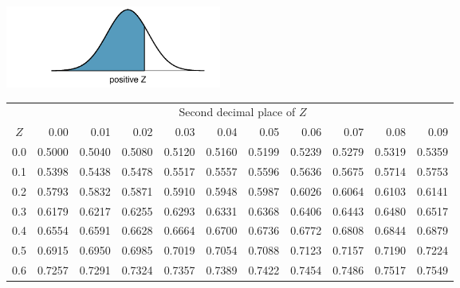 \begin{table}[p]
\begin{center}{\small
\includegraphics[width=71mm]{extraTeX/appendix/figures/normalTails/normalTailRight} \vspace{2mm} \\
\begin{tabular}{c | rrrrr | rrrrr |}
  \cline{2-11}
&&&& \multicolumn{4}{c}{Second decimal place of $Z$} &&& \\
  \cline{2-11}
$Z$ & 0.00 & 0.01 & 0.02 & 0.03 & 0.04 & 0.05 & 0.06 & 0.07 & 0.08 & 0.09 \\
  \hline
  \hline
0.0 & \scriptsize{0.5000} & \scriptsize{0.5040} & \scriptsize{0.5080} & \scriptsize{0.5120} & \scriptsize{0.5160} & \scriptsize{0.5199} & \scriptsize{0.5239} & \scriptsize{0.5279} & \scriptsize{0.5319} & \scriptsize{0.5359} \\
  0.1 & \scriptsize{0.5398} & \scriptsize{0.5438} & \scriptsize{0.5478} & \scriptsize{0.5517} & \scriptsize{0.5557} & \scriptsize{0.5596} & \scriptsize{0.5636} & \scriptsize{0.5675} & \scriptsize{0.5714} & \scriptsize{0.5753} \\
  0.2 & \scriptsize{0.5793} & \scriptsize{0.5832} & \scriptsize{0.5871} & \scriptsize{0.5910} & \scriptsize{0.5948} & \scriptsize{0.5987} & \scriptsize{0.6026} & \scriptsize{0.6064} & \scriptsize{0.6103} & \scriptsize{0.6141} \\
  0.3 & \scriptsize{0.6179} & \scriptsize{0.6217} & \scriptsize{0.6255} & \scriptsize{0.6293} & \scriptsize{0.6331} & \scriptsize{0.6368} & \scriptsize{0.6406} & \scriptsize{0.6443} & \scriptsize{0.6480} & \scriptsize{0.6517} \\
  0.4 & \scriptsize{0.6554} & \scriptsize{0.6591} & \scriptsize{0.6628} & \scriptsize{0.6664} & \scriptsize{0.6700} & \scriptsize{0.6736} & \scriptsize{0.6772} & \scriptsize{0.6808} & \scriptsize{0.6844} & \scriptsize{0.6879} \\
  \hline
  0.5 & \scriptsize{0.6915} & \scriptsize{0.6950} & \scriptsize{0.6985} & \scriptsize{0.7019} & \scriptsize{0.7054} & \scriptsize{0.7088} & \scriptsize{0.7123} & \scriptsize{0.7157} & \scriptsize{0.7190} & \scriptsize{0.7224} \\
  0.6 & \scriptsize{0.7257} & \scriptsize{0.7291} & \scriptsize{0.7324} & \scriptsize{0.7357} & \scriptsize{0.7389} & \scriptsize{0.7422} & \scriptsize{0.7454} & \scriptsize{0.7486} & \scriptsize{0.7517} & \scriptsize{0.7549} \\

\end{tabular}}
\end{center}
\end{table}

